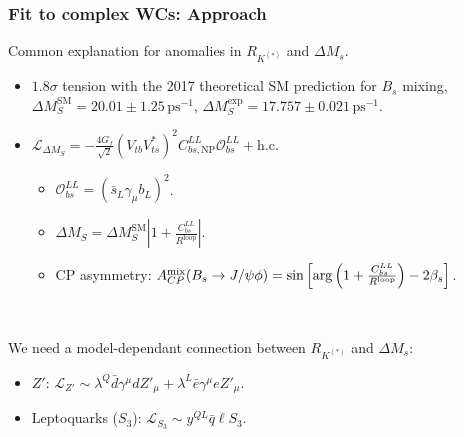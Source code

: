 \documentclass[mathserif, 10pt]{beamer}
\newcommand{\ACPmix}{\ensuremath{A_{CP}^{\rm{mix}}}}
\begin{document}
\begin{frame}\frametitle{Fit to complex WCs: Approach}
    Common explanation for anomalies in $R_{K^{(*)}}$ and $\Delta M_s$.
    \begin{itemize}
        \item $1.8\sigma$ tension with the 2017 theoretical SM prediction for $B_s$ mixing,\\
$\Delta M_S^\mathrm{SM} = 20.01 \pm 1.25\,\mathrm{ps}^{-1}$, \qquad$\Delta M_S^\mathrm{exp} = 17.757 \pm 0.021 \,\mathrm{ps}^{-1}$. \footnotemark[7]
        \item $\mathcal{L}_{\Delta M_S} = -\frac{4 G_f}{\sqrt{2}} (V_{tb} V_{ts}^*)^2 C_{bs, \mathrm{NP}}^{LL} \mathcal{O}_{bs}^{LL} + \mathrm{h. c.}$
              \begin{itemize}
                  \item $ \mathcal{O}_{bs}^{LL} = (\bar{s}_L \gamma_\mu b_L)^2$.
                  \item $\Delta M_S = \Delta M_S^\mathrm{SM} \left|1 + \frac{C_{bs}^{LL} }{R^\mathrm{loop}} \right|$.
\item CP asymmetry\footnotemark[7]: $\ACPmix (B_s\to J/\psi \phi)= \sin \left[\mathrm{arg}\left(   1 + \frac{C_{bs}^{LL} }{R^\mathrm{loop}} \right) - 2 \beta_s \right] $.
              \end{itemize}
    \end{itemize}

    ~

    We need a model-dependant connection between $R_{K^{(*)}}$ and $\Delta M_s$:
    \begin{itemize}
        \item $Z'$: $\mathcal{L}_{Z'} \sim \lambda^Q \bar{d}\gamma^\mu d Z'_\mu + \lambda^L \bar{e}\gamma^\mu e Z'_{\mu}$.
        \item Leptoquarks ($S_3$): $\mathcal{L}_{S_3} \sim y^{QL} \bar{q} \ell S_3$.
    \end{itemize}
\end{frame}
\end{document}
